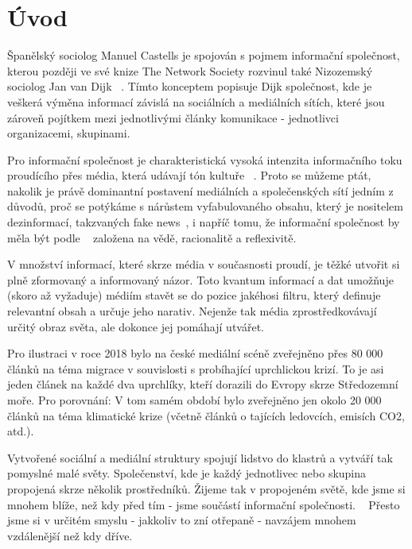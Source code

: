 \setcounter{page}{1}

\chapter*{Úvod}
\label{chapter:uvod}
    Španělský sociolog Manuel Castells je spojován s pojmem informační spole\-čnost, kterou později ve své knize The Network Society rozvinul také Nizozemský sociolog Jan van Dijk ~\citep{castells2011rise, van2020network}. Tímto konceptem popisuje Dijk společnost, kde je veškerá výměna informací závislá na sociálních a mediálních sítích, které jsou zároveň pojítkem mezi jednotlivými články komunikace - jednotlivci organizacemi, skupinami. 
    
    Pro informační společnost je charakteristická vysoká intenzita informačního toku proudícího přes média, která udávají tón kultuře ~\citep{van2020network}. Proto se můžeme ptát, nakolik je právě dominantní postavení mediálních a společenských sítí jedním z důvodů, proč se potýkáme s nárůstem vyfabulovaného obsahu, který je nositelem dezinformací, takzvaných fake news~\citep{lazer2018science}, i napříč tomu, že informační společnost by měla být podle ~\citep{van2020network} založena na vědě, racionalitě a reflexivitě.
    
    V množství informací, které skrze média v současnosti proudí, je těžké utvořit si plně zformovaný a informovaný názor. Toto kvantum informací a dat umožňuje (skoro až vyžaduje) médiím stavět se do pozice jakéhosi filtru, který definuje relevantní obsah a určuje jeho narativ. Nejenže tak média zprostředkovávají určitý obraz světa, ale dokonce jej pomáhají utvářet. ~\citep{vattimo1992transparent}
    
    Pro ilustraci v roce 2018 bylo na české mediální scéně zveřejněno přes 80 000 článků na téma migrace v souvislosti s probíhající uprchlickou krizí. To je asi jeden článek na každé dva uprchlíky, kteří dorazili do Evropy skrze Středozemní moře. Pro porovnání: V tom samém období bylo zveřejněno jen okolo 20 000 článků na téma klimatické krize (včetně článků o tajících ledovcích, emisích CO2, atd.). ~\citep{prokop2019slepe}
    
    Vytvořené sociální a mediální struktury spojují lidstvo do klastrů a vytváří tak pomyslné malé světy. Společenství, kde je každý jednotlivec nebo skupina propojená skrze několik prostředníků. Žijeme tak v propojeném světě, kde jsme si mnohem blíže, než kdy před tím - jsme součástí informační společnosti. ~\citep{van2020network} Přesto jsme si v určitém smyslu - jakkoliv to zní otřepaně - navzájem mnohem vzdálenější než kdy dříve. 
    

